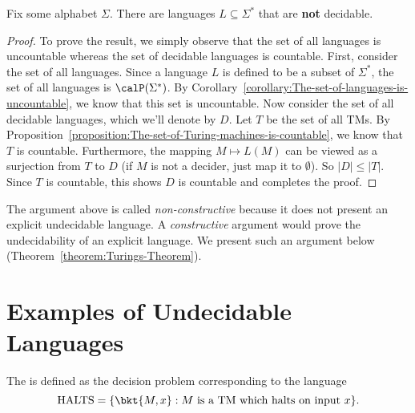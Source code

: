 \begin{flex}
\label{grp:theorem:Almost-all-languages-are-undecidable}

\begin{theorem}
\label{theorem:Almost-all-languages-are-undecidable}
Fix some alphabet $\Sigma$. There are languages $L \subseteq \Sigma^*$ that are \textbf{not} decidable.

\end{theorem}

\begin{proof}
\label{prf:Undecidable-Languages::prove}
To prove the result, we simply observe that the set of all languages is uncountable whereas the set of decidable languages is countable. First, consider the set of all languages. Since a language $L$ is defined to be a subset of $\Sigma^*$, the set of all languages is $\calP(\Sigma^*)$. By Corollary~\ref{corollary:The-set-of-languages-is-uncountable}, we know that this set is uncountable. Now consider the set of all decidable languages, which we'll denote by $D$. Let $T$ be the set of all TMs. By Proposition~\ref{proposition:The-set-of-Turing-machines-is-countable}, we know that $T$ is countable. Furthermore, the mapping $M \mapsto L(M)$ can be viewed as a surjection from $T$ to $D$ (if $M$ is not a decider, just map it to $\emptyset$). So $|D| \leq |T|$. Since $T$ is countable, this shows $D$ is countable and completes the proof.

\end{proof}
\end{flex}

\begin{note}
\label{note:Constructive-vs-non-constructive-proofs}
The argument above is called \emph{non-constructive} because it does not present an explicit undecidable language. A \emph{constructive} argument would prove the undecidability of an explicit language. We present such an argument below (Theorem~\ref{theorem:Turings-Theorem}). 

\end{note}


\section{Examples of Undecidable Languages}
\label{sec:Undecidable-Languages::examples-of-undecidable-languages}

\begin{definition}
\label{definition:Halting-problem} 
The  is defined as the decision problem corresponding to the language
$$
\text{HALTS} = \{\bkt{M,x} : \text{$M$ is a TM which halts on input $x$} \}.
$$

\end{definition}

